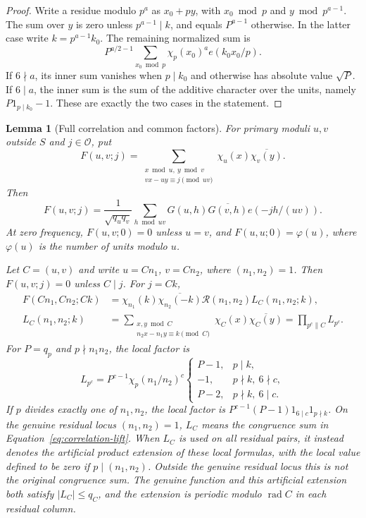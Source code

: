 \documentclass[12pt]{article}
\newtheorem{lemma}[theorem]{Lemma}
\begin{document}
\begin{proof}
Write a residue modulo $p^a$ as $x_0+py$, with $x_0\bmod p$ and
$y\bmod p^{a-1}$.  The sum over $y$ is zero unless $p^{a-1}\mid k$, and
equals $P^{a-1}$ otherwise.  In the latter case write $k=p^{a-1}k_0$.
The remaining normalized sum is
\[
 P^{a/2-1}\sum_{x_0\bmod p}\chi_p(x_0)^a e(k_0x_0/p).
\]
If $6\nmid a$, its inner sum vanishes when $p\mid k_0$ and otherwise has
absolute value $\sqrt P$.  If $6\mid a$, the inner sum is the sum of the
additive character over the units, namely $P1_{p\mid k_0}-1$.  These are
exactly the two cases in the statement.
\end{proof}

\begin{lemma}[Full correlation and common factors]\label{lem:full-correlation}
For primary moduli $u,v$ outside $S$ and $j\in\mathcal O$, put
\begin{equation}
 F(u,v;j)
 =\sum_{\substack{x\bmod u,\ y\bmod v\\
                    vx-uy\equiv j\pmod{uv}}}
       \chi_u(x)\overline{\chi_v(y)}.
 \label{old-eq:2.11}
\end{equation}
Then
\[
 F(u,v;j)=\frac1{\sqrt{q_uq_v}}\sum_{h\bmod uv}
 G(u,h)\overline{G(v,h)}e(-jh/(uv)).
\]
At zero frequency, $F(u,v;0)=0$ unless $u=v$, and
$F(u,u;0)=\varphi(u)$, where $\varphi(u)$ is the number of units modulo $u$.

Let $C=(u,v)$ and write $u=Cn_1$, $v=Cn_2$, where $(n_1,n_2)=1$.
Then $F(u,v;j)=0$ unless $C\mid j$.  For $j=Ck$,
\begin{equation}
 \begin{aligned}
 F(Cn_1,Cn_2;Ck)
 &=\chi_{n_1}(k)\overline{\chi_{n_2}(-k)}
      \mathcal R(n_1,n_2)L_C(n_1,n_2;k),\\
 L_C(n_1,n_2;k)
 &=\sum_{\substack{x,y\bmod C\\n_2x-n_1y\equiv k\pmod C}}
       \chi_C(x)\overline{\chi_C(y)}
   =\prod_{p^c\parallel C}L_{p^c}.
 \end{aligned}
 \label{eq:correlation-lift}
\end{equation}
For $P=q_p$ and $p\nmid n_1n_2$, the local factor is
\begin{equation}
 L_{p^c}=P^{c-1}\chi_p(n_1/n_2)^c
 \begin{cases}
 P-1,&p\mid k,\\
 -1,&p\nmid k,\ 6\nmid c,\\
 P-2,&p\nmid k,\ 6\mid c.
 \end{cases}
 \label{eq:correlation-local}
\end{equation}
If $p$ divides exactly one of $n_1,n_2$, the local factor is
$P^{c-1}(P-1)1_{6\mid c}1_{p\nmid k}$.  On the genuine residual locus
$(n_1,n_2)=1$, $L_C$ means the congruence sum in
Equation~\eqref{eq:correlation-lift}.  When $L_C$ is used on all residual
pairs, it instead denotes the artificial product extension of these local
formulas, with the local value defined to be zero if $p\mid(n_1,n_2)$.
Outside the genuine residual locus this is not the original congruence sum.
The genuine function and this artificial extension both satisfy
$|L_C|\le q_C$, and the extension is periodic modulo
$\operatorname{rad}C$ in each residual column.
\end{lemma}
\end{document}

